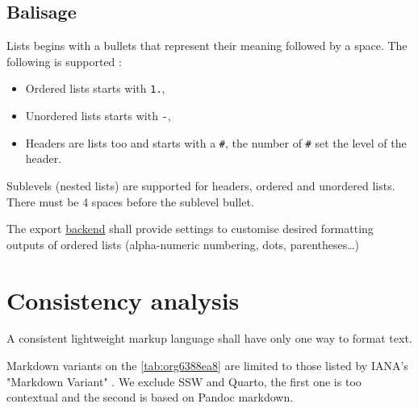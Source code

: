 \documentclass[a4paper,12pt]{article}
\begin{document}
\subsection{Balisage}
\label{sec:org8ed179d}
Lists begins with a bullets that represent their meaning followed by a space. The following is supported :
\begin{itemize}
\item Ordered lists starts with \texttt{1.},
\item Unordered lists starts with \texttt{-},
\item Headers are lists too and starts with a \texttt{\#}, the number of \texttt{\#} set the level of the header.
\end{itemize}

Sublevels (nested lists) are supported for headers, ordered and unordered lists. There must be 4 spaces before the sublevel bullet.

The export \protect\hyperlink{gls-4}{\label{gls-4-use-3}backend} shall provide settings to customise desired formatting outputs of ordered lists (alpha-numeric numbering, dots, parentheses\ldots{}) 
\section{Consistency analysis}
\label{sec:org45c601e}
A consistent lightweight markup language shall have only one way to format text.

Markdown variants on the \ref{tab:org6388ea8} are limited to those listed by IANA's "Markdown Variant" \autocite{MarkdownVariants2023}. We exclude SSW and Quarto, the first one is too contextual and the second is based on Pandoc markdown.
\end{document}
